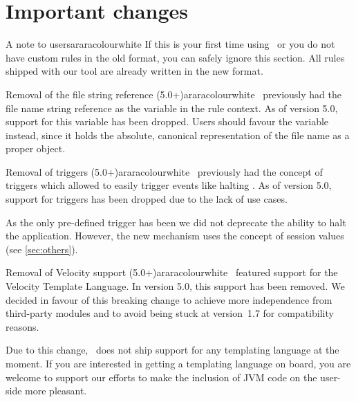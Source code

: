 \section{Important changes}
\label{sec:migrationguide}

\begin{messagebox}{A note to users}{araracolour}{\icattention}{white}
If this is your first time using \arara\ or you do not have custom rules in the old format, you can safely ignore this section. All rules shipped with our tool are already written in the new format.
\end{messagebox}

\begin{messagebox}{Removal of the file string reference (5.0+)}{araracolour}{\icattention}{white}
\arara\ previously had the file name string reference as the  variable in the rule context. As of version 5.0, support for this variable has been dropped. Users should favour the  variable instead, since it holds the absolute, canonical representation of the file name as a proper  object.
\end{messagebox}

\begin{messagebox}{Removal of triggers (5.0+)}{araracolour}{\icattention}{white}
\setlength{\parskip}{1em}
\arara\ previously had the concept of triggers which allowed to easily trigger events like halting \arara. As of version 5.0, support for triggers has been dropped due to the lack of use cases.

As the only pre-defined trigger has been  we did not deprecate the ability to halt the application. However, the new mechanism uses the concept of session values (see \autoref{sec:others}).
\end{messagebox}

\begin{messagebox}{Removal of Velocity support (5.0+)}{araracolour}{\icinfo}{white}
\setlength{\parskip}{1em}
\arara\ featured support for the Velocity Template Language. In version 5.0, this support has been removed. We decided in favour of this breaking change to achieve more independence from third-party modules and to avoid being stuck at version~1.7 for compatibility reasons.

Due to this change, \arara\ does not ship support for any templating language at the moment. If you are interested in getting a templating language on board, you are welcome to support our efforts to make the inclusion of JVM code on the user-side more pleasant.
\end{messagebox}

